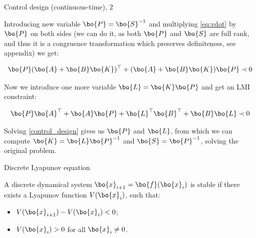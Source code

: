 \documentclass{beamer}
\begin{document}
\begin{frame}{Control design (continuous-time), 2}
	\begin{flushleft}
		
		Introducing new variable $\bo{P} = \bo{S}^{-1}$ and multiplying \eqref{eq:vdot} by $\bo{P}$ on both sides (we can do it, as both $\bo{P}$ and $\bo{S}$ are full rank, and thus it is a congruence transformation which preserves definiteness, see appendix) we get:
		
		\begin{equation}
			\bo{P}(\bo{A} + \bo{B}\bo{K})^\top + (\bo{A} + \bo{B}\bo{K})\bo{P} \prec 0
		\end{equation}
		
		Now we introduce one more variable $\bo{L} = \bo{K}\bo{P}$ and get an LMI constraint:
		
		\begin{equation}
			\label{control_design}
			\bo{P}\bo{A}^\top + \bo{A}\bo{P} + \bo{L}^\top\bo{B}^\top + \bo{B}\bo{L} \prec 0
		\end{equation}
		
		Solving \eqref{control_design} gives us $\bo{P}$ and $\bo{L}$, from which we can compute $\bo{K} = \bo{L}\bo{P}^{-1}$ and $\bo{S} = \bo{P}^{-1}$, solving the original problem.
		
	\end{flushleft}
\end{frame}






\begin{frame}{Discrete Lyapunov equation}
	\begin{flushleft}
		
		A discrete dynamical system $\bo{x}_{i+1} = \bo{f}(\bo{x}_i)$ is stable if there exists a Lyapunov function $V(\bo{x}_i)$, such that:
		
		\begin{itemize}
			\item $V(\bo{x}_{i+1}) - V(\bo{x}_i) < 0$;
			\item $V(\bo{x}_i) > 0$ for all $\bo{x}_i \neq 0$.
		\end{itemize}
		
	\end{flushleft}
\end{frame}
\end{document}
